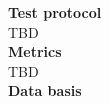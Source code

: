 \noindent\textbf{Test protocol}\\
TBD \\ 
 
\noindent\textbf{Metrics} \\
TBD \\

\noindent\textbf{Data basis} \\
